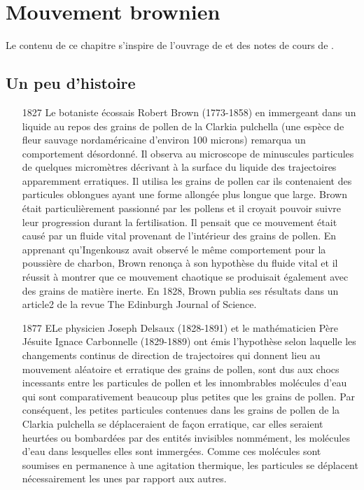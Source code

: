 \chapter{Mouvement brownien}\label{chap:mb}
Le contenu de ce chapitre s'inspire de l'ouvrage de \citet{Dobrow2016} et des notes de cours de \citet{MJB06}.
\section{Un peu d'histoire}
\begin{itemize}
  \item[1827] Le botaniste écossais Robert Brown (1773-1858) en immergeant dans un liquide au repos des grains de pollen de la Clarkia pulchella (une espèce de fleur sauvage nordaméricaine d’environ 100 microns) remarqua un comportement désordonné. Il observa au microscope de minuscules particules de quelques micromètres décrivant à la surface du liquide des trajectoires apparemment erratiques. Il utilisa les grains de pollen car ils contenaient des particules oblongues ayant une forme allongée plus longue que large. Brown était particulièrement passionné par les pollens et il croyait pouvoir suivre leur progression durant la fertilisation. Il pensait que ce mouvement était causé par un fluide vital provenant de l’intérieur des grains de pollen. En apprenant qu’Ingenkousz avait observé le même comportement pour la poussière de charbon, Brown renonça à son hypothèse du fluide vital et il réussit à montrer que ce mouvement chaotique se produisait également avec des grains de matière inerte.  En 1828, Brown publia ses résultats dans un article2 de la revue The Edinburgh Journal of Science.
  \item[1877] ELe physicien Joseph Delsaux (1828-1891) et le mathématicien Père Jésuite Ignace Carbonnelle (1829-1889) ont émis l’hypothèse selon laquelle les changements continus de direction de trajectoires qui donnent lieu au mouvement aléatoire et erratique des grains de pollen, sont dus aux chocs incessants entre les particules de pollen et les innombrables molécules d’eau qui sont comparativement beaucoup plus petites que les grains de pollen. Par conséquent, les petites particules contenues dans les grains de pollen de la Clarkia pulchella se déplaceraient de façon erratique, car elles seraient heurtées ou bombardées par des entités invisibles nommément, les molécules d’eau dans lesquelles elles sont immergées. Comme ces molécules sont soumises en permanence à une agitation thermique, les particules se déplacent nécessairement les unes par rapport aux autres. 

\end{itemize}
